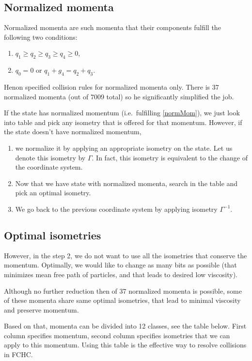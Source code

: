 \subsection{Normalized momenta}
Normalized momenta are such momenta that their components fulfill the following two conditions:
\begin{enumerate}
\item $q_1 \geq q_2 \geq q_3 \geq q_4 \geq 0$,  \label{normMom}
\item $q_0 = 0$ or $q_1+g_4 = q_2 + q_3$.
\end{enumerate}


Henon specified collision rules for normalized momenta only. There is 37 normalized momenta (out of 7009 total) so he significantly simplified the job.

If the state has normalized momentum (i.e.\ fulfilling \ref{normMom}), we just look into table and pick any isometry that is offered for that momentum. However, if the state doesn't have normalized momentum,
\begin{enumerate}
\item we normalize it by applying an appropriate isometry on the state. Let us denote this isometry by $\Gamma$. In fact, this isometry is equivalent to the change of the coordinate system.

\item Now that we have state with normalized momenta, search in the table and pick an optimal isometry.

\item We go back to the previous coordinate system by applying isometry $\Gamma^{-1}$.
\end{enumerate}

\subsection{Optimal isometries}

However, in the step 2, we do not want to use all the isometries that conserve the momentum.
Optimally, we would like to change as many bits as possible (that minimizes mean free path of particles, and that leads to desired low viscosity).

Although no further reduction then of 37 normalized momenta is possible,
some of these momenta share same optimal isometries, that lead to minimal viscosity and preserve momentum.

Based on that,  momenta can be divided into 12 classes, see the table below.
First column specifies momentum, second column specifies isometries that we can apply to this momentum. Using this table is the effective way to resolve collisions in FCHC.

